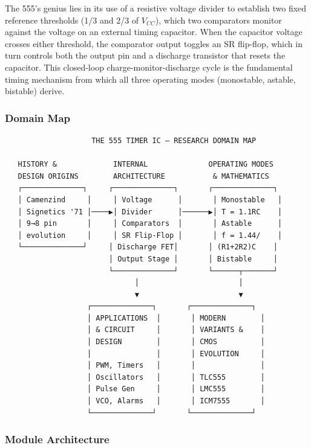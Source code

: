 \documentclass[11pt,letterpaper]{article}
\begin{document}
The 555's genius lies in its use of a resistive voltage divider to establish two fixed reference thresholds (1/3 and 2/3 of $V_{CC}$), which two comparators monitor against the voltage on an external timing capacitor. When the capacitor voltage crosses either threshold, the comparator output toggles an SR flip-flop, which in turn controls both the output pin and a discharge transistor that resets the capacitor. This closed-loop charge-monitor-discharge cycle is the fundamental timing mechanism from which all three operating modes (monostable, astable, bistable) derive.

\subsubsection{Domain Map}

\begin{asciibox}
\begin{verbatim}
                    THE 555 TIMER IC — RESEARCH DOMAIN MAP

   HISTORY &             INTERNAL              OPERATING MODES
   DESIGN ORIGINS        ARCHITECTURE           & MATHEMATICS
   ┌──────────────┐     ┌──────────────┐       ┌──────────────┐
   │ Camenzind     │     │ Voltage      │       │ Monostable   │
   │ Signetics '71 │────▶│ Divider      │──────▶│ T = 1.1RC    │
   │ 9→8 pin       │     │ Comparators  │       │ Astable      │
   │ evolution     │     │ SR Flip-Flop │       │ f = 1.44/    │
   └──────────────┘     │ Discharge FET│       │ (R1+2R2)C    │
                        │ Output Stage │       │ Bistable     │
                        └──────────────┘       └──────┬───────┘
                              │                       │
                              ▼                       ▼
                   ┌──────────────┐       ┌──────────────┐
                   │ APPLICATIONS  │       │ MODERN        │
                   │ & CIRCUIT     │       │ VARIANTS &    │
                   │ DESIGN        │       │ CMOS          │
                   │               │       │ EVOLUTION     │
                   │ PWM, Timers   │       │               │
                   │ Oscillators   │       │ TLC555        │
                   │ Pulse Gen     │       │ LMC555        │
                   │ VCO, Alarms   │       │ ICM7555       │
                   └──────────────┘       └──────────────┘
\end{verbatim}
\end{asciibox}

\subsubsection{Module Architecture}
\end{document}
